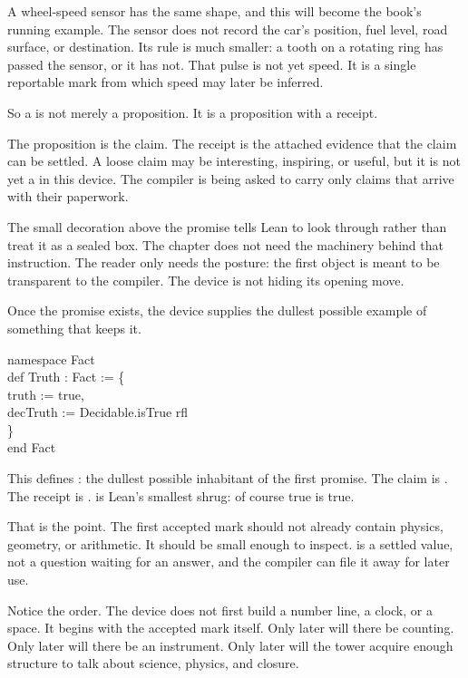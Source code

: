 A wheel-speed sensor has the same shape, and this will become the book's
running example. The sensor does not record the car's position, fuel level,
road surface, or destination. Its rule is much smaller: a tooth on a rotating
ring has passed the sensor, or it has not. That pulse is not yet speed. It is a
single reportable mark from which speed may later be inferred.

So a  is not merely a proposition. It is a proposition with a
receipt.

The proposition is the claim. The receipt is the attached evidence that the
claim can be settled. A loose claim may be interesting, inspiring, or useful,
but it is not yet a  in this device. The compiler is being asked to
carry only claims that arrive with their paperwork.

The small decoration  above the promise tells Lean to look
through  rather than treat it as a sealed box. The chapter does not
need the machinery behind that instruction. The reader only needs the posture:
the first object is meant to be transparent to the compiler. The device is not
hiding its opening move.

Once the promise exists, the device supplies the dullest possible example of
something that keeps it.

\begin{leancode}
namespace Fact\\
def Truth : Fact := \{\\
\hspace*{2em}truth := true,\\
\hspace*{2em}decTruth := Decidable.isTrue rfl\\
\}\\
end Fact
\end{leancode}

This defines : the dullest possible inhabitant of the first
promise. The claim is . The receipt is .
 is Lean's smallest shrug: of course true is true.

That is the point. The first accepted mark should not already contain physics,
geometry, or arithmetic. It should be small enough to inspect. 
is a settled value, not a question waiting for an answer, and the compiler can
file it away for later use.

Notice the order. The device does not first build a number line, a clock, or a
space. It begins with the accepted mark itself. Only later will there be
counting. Only later will there be an instrument. Only later will the tower
acquire enough structure to talk about science, physics, and closure.


